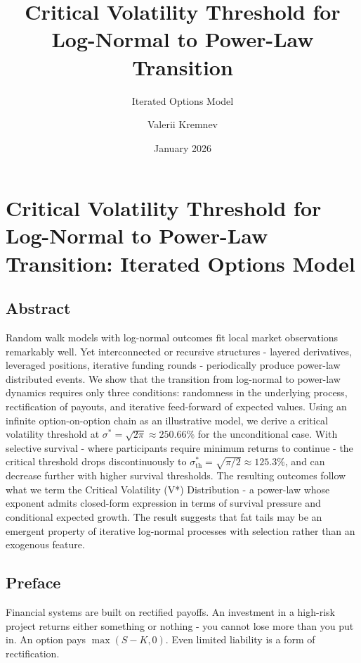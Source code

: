 \documentclass[
  11pt,
  openany]{article}
\title{Critical Volatility Threshold for Log-Normal to Power-Law
Transition}
\subtitle{Iterated Options Model}
\author{Valerii Kremnev}
\date{January 2026}
\begin{document}
\maketitle


\setcounter{tocdepth}{2}
\tableofcontents

\section{Critical Volatility Threshold for Log-Normal to Power-Law
Transition: Iterated Options
Model}\label{critical-volatility-threshold-for-log-normal-to-power-law-transition-iterated-options-model}

\subsection{Abstract}\label{abstract}

Random walk models with log-normal outcomes fit local market
observations remarkably well. Yet interconnected or recursive structures
- layered derivatives, leveraged positions, iterative funding rounds -
periodically produce power-law distributed events. We show that the
transition from log-normal to power-law dynamics requires only three
conditions: randomness in the underlying process, rectification of
payouts, and iterative feed-forward of expected values. Using an
infinite option-on-option chain as an illustrative model, we derive a
critical volatility threshold at
\(\sigma^* = \sqrt{2\pi} \approx 250.66\%\) for the unconditional case.
With selective survival - where participants require minimum returns to
continue - the critical threshold drops discontinuously to
\(\sigma_{\text{th}}^{*} = \sqrt{\pi/2} \approx 125.3\%\), and can
decrease further with higher survival thresholds. The resulting outcomes
follow what we term the Critical Volatility (V*) Distribution - a
power-law whose exponent admits closed-form expression in terms of
survival pressure and conditional expected growth. The result suggests
that fat tails may be an emergent property of iterative log-normal
processes with selection rather than an exogenous feature.

\subsection{Preface}\label{preface}

Financial systems are built on rectified payoffs. An investment in a
high-risk project returns either something or nothing - you cannot lose
more than you put in. An option pays \(\max(S - K, 0)\). Even limited
liability is a form of rectification.
\end{document}
